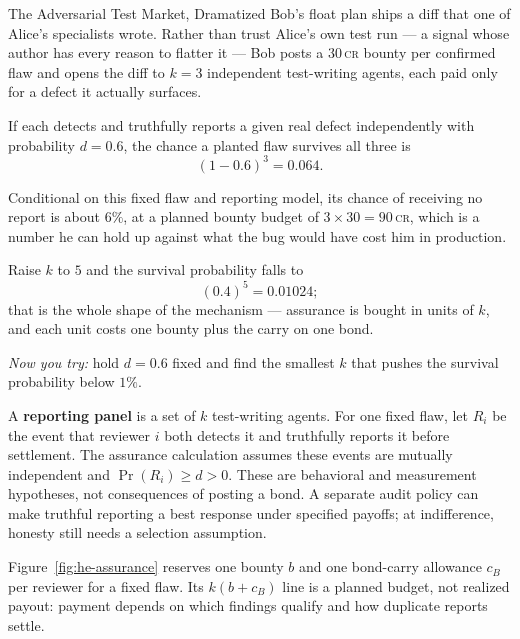 \documentclass[11pt,a4paper]{article}
\theoremstyle{definition}
\theoremstyle{definition}
\theoremstyle{remark}
\begin{document}
\begin{pdexample}{The Adversarial Test Market, Dramatized}
\setlength{\parskip}{4pt plus 1pt}
Bob's float plan ships a diff
that one of Alice's specialists wrote. Rather than trust Alice's own test run --- a
signal whose author has every reason to flatter it --- Bob posts a $30$\,\textsc{cr}
bounty per confirmed flaw and opens the diff to $k=3$ independent test-writing
agents, each paid only for a defect it actually surfaces.

If each detects and truthfully reports a given
real defect independently with probability $d = 0.6$, the chance a planted flaw
survives all three is \[
(1-0.6)^3 = 0.064.
\]

Conditional on this fixed flaw and reporting model, its chance of receiving
no report is about $6\%$, at a planned bounty budget of $3 \times 30 = 90$\,\textsc{cr}, which is a number he
can hold up against what the bug would have cost him in production.

Raise $k$ to $5$
and the survival probability falls to \[
(0.4)^5 = 0.01024;
\] that is the whole shape of
the mechanism --- assurance is bought in units of $k$, and each unit costs one
bounty plus the carry on one bond.

\emph{Now you try:} hold $d=0.6$ fixed and find
the smallest $k$ that pushes the survival probability below $1\%$.
\end{pdexample}

A \textbf{reporting panel} is a set of $k$ test-writing agents.
For one fixed flaw, let $R_i$ be the event that reviewer $i$ both detects it
and truthfully reports it before settlement. The assurance calculation assumes
these events are mutually independent and $\Pr(R_i)\ge d>0$.
These are behavioral and measurement hypotheses, not consequences of posting a
bond. A separate audit policy can make truthful reporting a best response under
specified payoffs; at indifference, honesty still needs a selection assumption.

Figure~\ref{fig:he-assurance} reserves one bounty $b$ and one bond-carry
allowance $c_B$ per reviewer for a fixed flaw. Its $k(b+c_B)$ line is a planned
budget, not realized payout: payment depends on which findings qualify and how
duplicate reports settle.


\FloatBarrier
\end{document}
